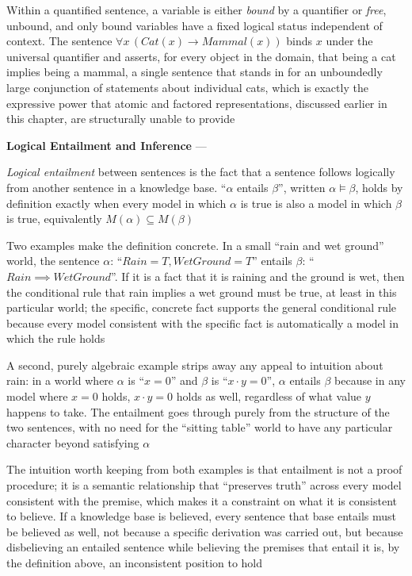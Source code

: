 Within a quantified sentence, a variable is either \emph{bound} by a
quantifier or \emph{free}, unbound, and only bound variables have a fixed
logical status independent of context. The sentence $\forall x\,
(Cat(x) \rightarrow Mammal(x))$ binds $x$ under the universal quantifier
and asserts, for every object in the domain, that being a cat implies being
a mammal, a single sentence that stands in for an unboundedly large
conjunction of statements about individual cats, which is exactly the
expressive power that atomic and factored representations, discussed
earlier in this chapter, are structurally unable to provide

\textbf{Logical Entailment and Inference} --- \begin{definition}
  \emph{Logical entailment} between sentences is the fact that a sentence
  follows logically from another sentence in a knowledge base. ``$\alpha$
  entails $\beta$'', written $\alpha \models \beta$, holds by definition
  exactly when every model in which $\alpha$ is true is also a model in
  which $\beta$ is true, equivalently $M(\alpha) \subseteq M(\beta)$
\end{definition}
Two examples make the definition concrete. In a small ``rain and wet
ground'' world, the sentence $\alpha$: ``$Rain = T, WetGround = T$'' entails
$\beta$: ``$Rain \implies WetGround$''. If it is a fact that it is raining
and the ground is wet, then the conditional rule that rain implies a wet
ground must be true, at least in this particular world; the specific,
concrete fact supports the general conditional rule because every model
consistent with the specific fact is automatically a model in which the
rule holds

A second, purely algebraic example strips away any appeal to intuition
about rain: in a world where $\alpha$ is ``$x = 0$'' and $\beta$ is
``$x \cdot y = 0$'', $\alpha$ entails $\beta$ because in any model where
$x = 0$ holds, $x \cdot y = 0$ holds as well, regardless of what value $y$
happens to take. The entailment goes through purely from the structure of
the two sentences, with no need for the ``sitting table'' world to have any
particular character beyond satisfying $\alpha$

The intuition worth keeping from both examples is that entailment is not a
proof procedure; it is a semantic relationship that ``preserves truth''
across every model consistent with the premise, which makes it a
constraint on what it is consistent to believe. If a knowledge base is
believed, every sentence that base entails must be believed as well, not
because a specific derivation was carried out, but because disbelieving an
entailed sentence while believing the premises that entail it is, by the
definition above, an inconsistent position to hold

